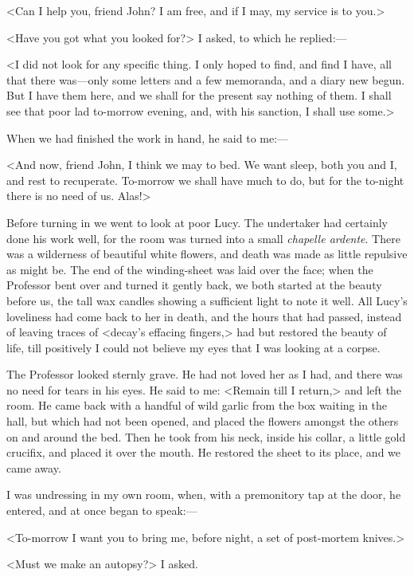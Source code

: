 <Can I help you, friend John? I am free, and if I may, my service is to you.>

<Have you got what you looked for?> I asked, to which he replied:—

<I did not look for any specific thing. I only hoped to find, and find I have, all that there was—only some letters and a few memoranda, and a diary new begun. But I have them here, and we shall for the present say nothing of them. I shall see that poor lad to-morrow evening, and, with his sanction, I shall use some.>

When we had finished the work in hand, he said to me:—

<And now, friend John, I think we may to bed. We want sleep, both you and I, and rest to recuperate. To-morrow we shall have much to do, but for the to-night there is no need of us. Alas!>

Before turning in we went to look at poor Lucy. The undertaker had certainly done his work well, for the room was turned into a small \textit{chapelle ardente}. There was a wilderness of beautiful white flowers, and death was made as little repulsive as might be. The end of the winding-sheet was laid over the face; when the Professor bent over and turned it gently back, we both started at the beauty before us, the tall wax candles showing a sufficient light to note it well. All Lucy's loveliness had come back to her in death, and the hours that had passed, instead of leaving traces of <decay's effacing fingers,> had but restored the beauty of life, till positively I could not believe my eyes that I was looking at a corpse.

The Professor looked sternly grave. He had not loved her as I had, and there was no need for tears in his eyes. He said to me: <Remain till I return,> and left the room. He came back with a handful of wild garlic from the box waiting in the hall, but which had not been opened, and placed the flowers amongst the others on and around the bed. Then he took from his neck, inside his collar, a little gold crucifix, and placed it over the mouth. He restored the sheet to its place, and we came away.

I was undressing in my own room, when, with a premonitory tap at the door, he entered, and at once began to speak:—

<To-morrow I want you to bring me, before night, a set of post-mortem knives.>

<Must we make an autopsy?> I asked.

